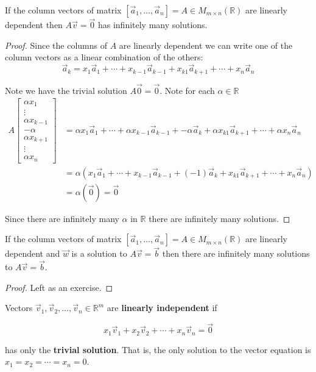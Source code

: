 \begin{proposition}\label{prop:not_injective} If the column vectors of matrix $[\vec{a}_1, \ldots, \vec{a}_n]=A \in M_{m\times n}(\mathbb{R})$ are linearly dependent then $A\vec{v}=\vec{0}$ has infinitely many solutions.
\end{proposition}
\begin{proof}
Since the columns of $A$ are linearly dependent we can write one of the column vectors as a linear combination of the others:
\[
\vec{a}_k = x_1\vec{a}_1+\cdots+x_{k-1}\vec{a}_{k-1}+x_{k1}\vec{a}_{k+1}+\cdots+x_n\vec{a}_n
\]

Note we have the trivial solution $A\vec{0}=\vec{0}$. Note for each $\alpha \in \mathbb{R}$ 
\begin{align*}
A \begin{bmatrix}\alpha x_1 \\ \vdots \\ \alpha x_{k-1} \\ -\alpha \\ \alpha x_{k+1} \\ \vdots \\ \alpha x_n \end{bmatrix}
&= \alpha x_1\vec{a}_1+\cdots+ \alpha x_{k-1}\vec{a}_{k-1}+-\alpha \vec{a}_k+ \alpha x_{k1}\vec{a}_{k+1}+\cdots+\alpha x_n\vec{a}_n\\
&= \alpha (x_1\vec{a}_1+\cdots+ x_{k-1}\vec{a}_{k-1}+(-1)\vec{a}_k+  x_{k1}\vec{a}_{k+1}+\cdots+ x_n\vec{a}_n) \\
&= \alpha(\vec{0}) = \vec{0}
\end{align*}

Since there are infinitely many $\alpha$ in $\mathbb{R}$ there are infinitely many solutions.
\end{proof}

\begin{proposition}\label{prop:deprows_infsol} 
If the column vectors of matrix $[\vec{a}_1, \ldots, \vec{a}_n]=A \in M_{m\times n}(\mathbb{R})$ are linearly dependent and $\vec{w}$ is a solution to $A\vec{v}=\vec{b}$ then there are infinitely many solutions to $A\vec{v}=\vec{b}$.
\end{proposition}
\begin{proof}
Left as an exercise.
\end{proof}

\begin{definition}
Vectors $\vec{v}_1, \vec{v}_2, \ldots, \vec{v}_n \in \mathbb{R}^m$ are \textbf{linearly independent} if 

$$x_1\vec{v}_1+x_2\vec{v}_2+\cdots + x_n \vec{v}_n=\vec{0}$$

has only the \textbf{trivial solution}. That is, the only solution to the vector equation is $x_1=x_2=\cdots=x_n=0$.  
\end{definition}

